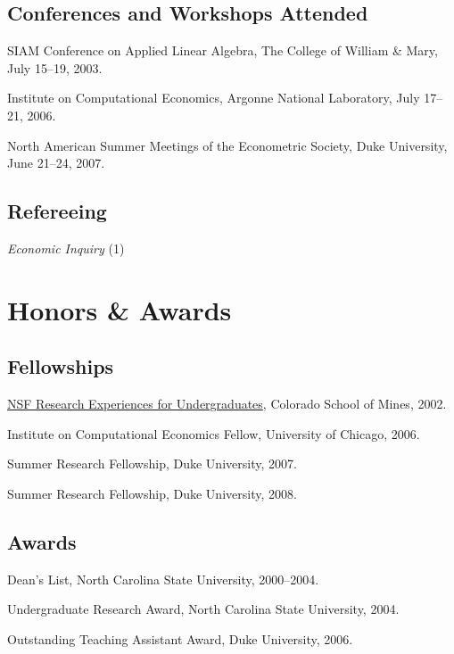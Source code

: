 \documentclass[letterpaper]{article}
\renewenvironment{itemize}{
  \begin{list}{}{
    \setlength{\leftmargin}{1em}
  }
}{
  \end{list}
}
\begin{document}
\subsection*{Conferences and Workshops Attended}

\begin{itemize}
\item SIAM Conference on Applied Linear Algebra,
  The College of William \& Mary,
  July 15--19, 2003.
\item Institute on Computational Economics,
  Argonne National Laboratory,
  July 17--21, 2006.
\item North American Summer Meetings of the Econometric Society,
  Duke University,
  June 21--24, 2007.
\end{itemize}

\subsection*{Refereeing}

\begin{itemize}
\item \textit{Economic Inquiry} (1)
\end{itemize}


\section*{Honors \& Awards}

\subsection*{Fellowships}

\begin{itemize}
\item \href{http://www.nsf.gov/crssprgm/reu/}{NSF Research Experiences
    for Undergraduates}, Colorado School of Mines, 2002.
\item Institute on Computational Economics Fellow, University of Chicago, 2006.
\item Summer Research Fellowship, Duke University, 2007.
\item Summer Research Fellowship, Duke University, 2008.
\end{itemize}

\subsection*{Awards}

\begin{itemize}
\item Dean's List, North Carolina State University, 2000--2004.
\item Undergraduate Research Award, North Carolina State University, 2004.
\item Outstanding Teaching Assistant Award, Duke University, 2006.
\end{itemize}
\end{document}
